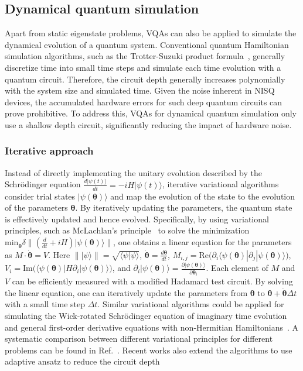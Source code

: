 \documentclass[prx,twocolumn,floatfix,superscriptaddress,longbibliography]{revtex4-1}
\renewcommand{\vec}[1]{\boldsymbol{#1}}  %
\newcommand{\<}{\langle}
\renewcommand{\>}{\rangle}
\newcommand{\ket}[1]{|#1\rangle}               %
\newcommand{\bra}[1]{\langle #1|}              %
\renewcommand{\vec}[1]{\boldsymbol{#1}}  %
\begin{document}
\subsection*{Dynamical quantum simulation}\label{sec:dynamical-quantum-simulation}
Apart from static eigenstate problems, VQAs can also be applied to simulate the dynamical evolution of a quantum system. Conventional quantum Hamiltonian simulation algorithms, such as the Trotter-Suzuki product formula~\cite{nielsen_chuang}, generally discretize time into small time steps and simulate each time evolution with a quantum circuit. Therefore, the circuit depth generally increases polynomially with the system size and simulated time.
Given the noise inherent in NISQ devices, the accumulated hardware errors for such deep quantum circuits can prove prohibitive. To address this, VQAs for dynamical quantum simulation only use a shallow depth circuit, significantly reducing the impact of hardware noise.

 
\subsubsection{ Iterative approach} Instead of directly implementing the unitary evolution described by the Schr\"odinger equation $\frac{d\ket{\psi(t)}}{dt} =-iH \ket{\psi(t)}$, iterative variational algorithms~\cite{li2017efficient,yuan2019theory} consider trial states $\ket{\psi(\vec \theta)}$ and map the evolution of the state to the evolution of the parameters $\vec \theta$. By iteratively updating the parameters, the quantum state is effectively updated and hence evolved. Specifically, by using variational principles, such as McLachlan's principle~\cite{mclachlan1964variational} to solve the minimization $\mathrm{min}_{\dot{\vec{\theta}}} \delta \|(\frac{d}{dt}+iH) \ket{\psi(\vec{\theta})} \|$, one obtains a linear equation for the parameters as $M \cdot \dot{\vec{\theta}} = V$. Here $\|\ket{\psi}\|=\sqrt{\bra{\psi}{\psi}\rangle}$, $\dot{\vec\theta} = \frac{d \vec\theta}{dt}$, $M_{i,j}=\mathrm{Re}\big(\partial_i\bra{\psi(\vec{\theta})}  \partial_j \ket{\psi(\vec{\theta})} \big)$, $V_i=\mathrm{Im}\big(\bra{\psi(\vec{\theta})} H \partial_i \ket{\psi(\vec{\theta})} \big)$, and $ \partial_i \ket{\psi(\vec{\theta})}=\frac{\partial \ket{\psi(\vec{\theta})}}{\partial\vec{\theta}_i}$. Each element of $M$ and $V$ can be efficiently measured with a modified  Hadamard test circuit. By solving the linear equation, one can iteratively update the parameters from $\vec{\theta}$ to $\vec{\theta}+ \dot{\vec\theta} \Delta t $ with a small time step $\Delta t$. 
Similar variational algorithms could be applied for simulating the Wick-rotated Schr\"odinger equation of imaginary time evolution~\cite{mcardle2019variational} and general first-order derivative equations with non-Hermitian Hamiltonians~\cite{endo2018variational}. A systematic comparison between different variational principles for different problems can be found in Ref.~\cite{yuan2019theory}. Recent works also extend the algorithms to use adaptive ansatz to reduce the circuit depth~\cite{yao2020adaptive,zhang2020lowdepth}
\end{document}
